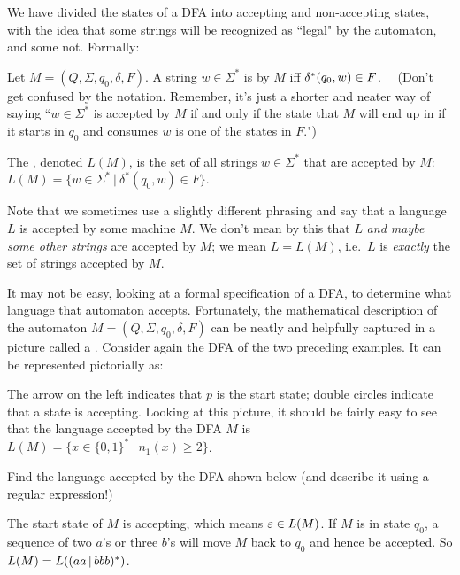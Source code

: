 \smallskip

We have divided the states of a DFA into accepting and non-accepting states, with
the idea that some strings will be recognized as ``legal" by the automaton, and
some not.  Formally:

\begin{definition}
Let $M=(Q, \Sigma, q_0, \delta, F)$.  A string $w \in \Sigma^*$ is 
by $M$ iff $\delta^*(q_0, w) \in F$. \ \ (Don't get confused by the notation.  
Remember, it's just a shorter and neater way of saying
``$w \in \Sigma^*$ is accepted by $M$ if and only if the state that $M$ will end
up in
if it starts in $q_0$ and consumes $w$ is one of the states in $F$.")

The , denoted $L(M)$, is the set of all strings 
$w \in \Sigma^*$ that are accepted by $M$: 
$L(M) = \{ w \in\Sigma^* \ | \ \delta^*(q_0, w) \in F\}$.

\end{definition}

\smallskip
Note that we sometimes use a slightly different phrasing and say that a language
$L$ is accepted by some machine $M$.  We don't mean by this that $L$ {\em and
maybe some other strings} are accepted by $M$; we mean $L = L(M)$, i.e.\ $L$ is
{\em exactly} the set of strings accepted by $M$.

It may not be easy, looking at a formal specification of a DFA, to determine what
language that automaton accepts.  Fortunately, the mathematical description of
the automaton $M=(Q, \Sigma, q_0, \delta, F)$ can be neatly and helpfully
captured in a picture called a .  
Consider again the DFA of the two preceding examples.  It
can be represented pictorially as:


\noindent The arrow on the left indicates that $p$ is the start state; double
circles indicate that a state is accepting.  Looking at this picture, it should
be fairly easy to see that the language accepted by the DFA $M$ is 
$L(M) = \{ x \in \{0,1\}^* \ | \ n_1(x) \geq 2\}$.

\begin{example}
Find the language accepted by the DFA shown below (and describe it using a
regular expression!)


The start state of $M$ is accepting, which means $\varepsilon \in L(M)$.  If $M$ is
in state $q_0$, a
sequence of two $a$'s or three $b$'s will move $M$ back to $q_0$ and hence
be accepted.  So $L(M) = L((aa\hbox{$\,|\,$} bbb)^*)$.
\end{example}

